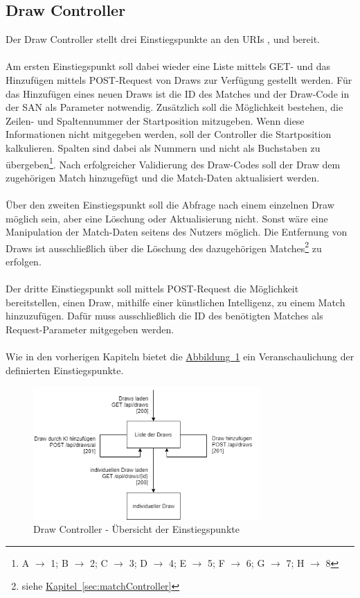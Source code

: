 \subsection{Draw Controller}\label{sec:drawController}
Der Draw Controller stellt drei Einstiegspunkte an den \glspl{URI} ,  und  bereit. \\
\\
Am ersten Einstiegspunkt soll dabei wieder eine Liste mittels GET- und das Hinzufügen mittels POST-Request von Draws zur Verfügung gestellt werden. Für das Hinzufügen eines neuen Draws ist die ID des Matches und der Draw-Code in der \gls{SAN} als Parameter notwendig. Zusätzlich soll die Möglichkeit bestehen, die Zeilen- und Spaltennummer der Startposition mitzugeben. Wenn diese Informationen nicht mitgegeben werden, soll der Controller die Startposition kalkulieren. Spalten sind dabei als Nummern und nicht als Buchstaben zu übergeben\footnote{A $\rightarrow$ 1; B $\rightarrow$ 2; C $\rightarrow$ 3; D $\rightarrow$ 4; E $\rightarrow$ 5; F $\rightarrow$ 6; G $\rightarrow$ 7; H $\rightarrow$ 8}. Nach erfolgreicher Validierung des Draw-Codes soll der Draw dem zugehörigen Match hinzugefügt und die Match-Daten aktualisiert werden.\\
\\
Über den zweiten Einstiegspunkt soll die Abfrage nach einem einzelnen Draw möglich sein, aber eine Löschung oder Aktualisierung nicht. Sonst wäre eine Manipulation der Match-Daten seitens des Nutzers möglich. Die Entfernung von Draws ist ausschließlich über die Löschung des dazugehörigen Matches\footnote{siehe \hyperref[sec:matchController]{Kapitel~\ref{sec:matchController}}} zu erfolgen.\\
\\
Der dritte Einstiegspunkt soll mittels POST-Request die Möglichkeit bereitstellen, einen Draw, mithilfe einer künstlichen Intelligenz, zu einem Match hinzuzufügen. Dafür muss ausschließlich die ID des benötigten Matches als Request-Parameter mitgegeben werden.\\
\\
Wie in den vorherigen Kapiteln bietet die \hyperref[fig:drawController]{Abbildung~\ref{fig:drawController}} ein Veranschaulichung der definierten Einstiegspunkte.\\
\begin{figure}[htb]
	\includegraphics[width=0.7735\textwidth]{images/draw-controller.png}
	\caption{Draw Controller - Übersicht der Einstiegspunkte}
	\label{fig:drawController}
\end{figure}

